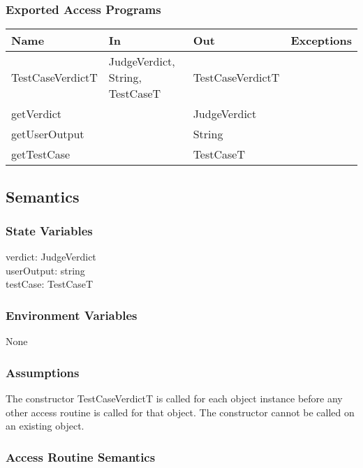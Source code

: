\documentclass[12pt, titlepage]{article}
\begin{document}
\subsubsection{Exported Access Programs}

\begin{center}
\begin{tabular}{ |  p{4cm} | p{3cm} |  p{3cm} | p{5cm} | }
\hline
\textbf{Name} & \textbf{In} & \textbf{Out} & \textbf{Exceptions} \\
\hline
TestCaseVerdictT & JudgeVerdict, String, TestCaseT & TestCaseVerdictT & \\
getVerdict & & JudgeVerdict & \\
getUserOutput & & String & \\
getTestCase & & TestCaseT & \\

\hline
\end{tabular}
\end{center}

\subsection{Semantics}

\subsubsection{State Variables}

verdict: JudgeVerdict \\
userOutput: string \\
testCase: TestCaseT

\subsubsection{Environment Variables}

None

\subsubsection{Assumptions}

The constructor TestCaseVerdictT is called for each object instance before any other access routine is called for that object. The constructor cannot be called on an existing object.


\subsubsection{Access Routine Semantics}
\end{document}
